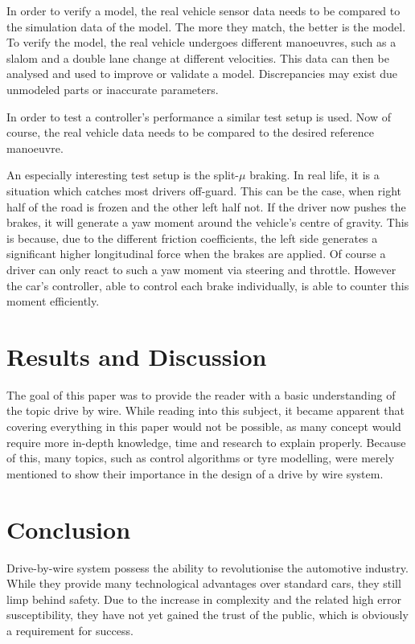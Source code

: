 \documentclass[conference]{IEEEtran}
\begin{document}
In order to verify a model, the real vehicle sensor data needs to be compared to the simulation data of the model. The more they match, the better is the model. To verify the model, the real vehicle undergoes different manoeuvres, such as a slalom and a double lane change at different velocities. This data can then be analysed and used to improve or validate a model. Discrepancies may exist due unmodeled parts or inaccurate parameters.

In order to test a controller's performance a similar test setup is used. Now of course, the real vehicle data needs to be compared to the desired reference manoeuvre.

An especially interesting test setup is the split-$\mu$ braking. In real life, it is a situation which catches most drivers off-guard. This can be the case, when right half of the road is frozen and the other left half not. If the driver now pushes the brakes, it will generate a yaw moment around the vehicle's centre of gravity. This is because, due to the different friction coefficients, the left side generates a significant higher longitudinal force when the brakes are applied. Of course a driver can only react to such a yaw moment via steering and throttle. However the car's controller, able to control each brake individually, is able to counter this moment efficiently.


\section{Results and Discussion}

The goal of this paper was to provide the reader with a basic understanding of the topic drive by wire. While reading into this subject, it became apparent that covering everything in this paper would not be possible, as many concept would require more in-depth knowledge, time and research to explain properly. Because of this, many topics, such as control algorithms or tyre modelling, were merely mentioned to show their importance in the design of a drive by wire system.

\section{Conclusion}

Drive-by-wire system possess the ability to revolutionise the automotive industry. While they provide many technological advantages over standard cars, they still limp behind safety. Due to the increase in complexity and the related high error susceptibility, they have not yet gained the trust of the public, which is obviously a requirement for success. 
\end{document}
